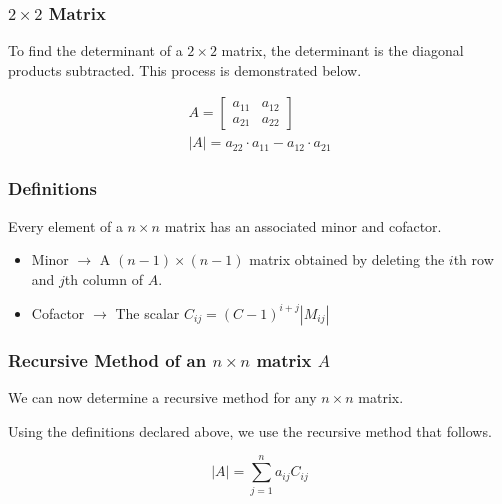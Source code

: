         \subsubsection{$2 \times 2$ Matrix}\label{subsubsec:22mat}
        To find the determinant of a $2 \times 2$ matrix, the determinant is the diagonal products subtracted. This process is demonstrated below.

        \begin{equation}\label{eq:22det}
        \begin{aligned}
            A =
            \left[\begin{array}{cc}
                a_{11} & a_{12}\\
                a_{21} & a_{22}
            \end{array}\right]\\
            \left| A \right| = a_{22} \cdot a_{11} - a_{12} \cdot a_{21}
        \end{aligned}
        \end{equation}

        \subsubsection{Definitions}
        Every element of a $n \times n$ matrix has an associated minor and cofactor.

        \begin{itemize}
        \item Minor $\to$ A $(n - 1) \times (n - 1)$ matrix obtained by deleting the $i$th row and $j$th column of $A$.
        \item Cofactor $\to$ The scalar $C_{ij} = (C - 1)^{i+j} \left| M_{ij} \right|$
        \end{itemize}

        \subsubsection{Recursive Method of an $n \times n$ matrix $A$}
        We can now determine a recursive method for any $n \times n$ matrix.

        Using the definitions declared above, we use the recursive method that follows.

        \begin{equation}\label{eq:detrec}
        \left| A \right| = \sum_{j=1}^n a_{ij} C_{ij}
        \end{equation}

